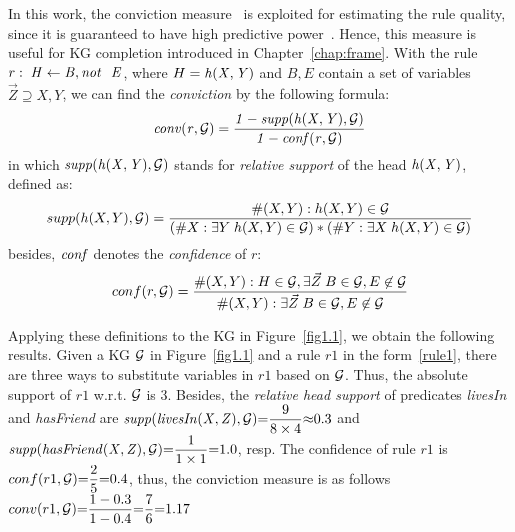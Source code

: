 In this work, the conviction measure~\cite{ref48} is exploited for estimating the rule quality, since it is guaranteed to have high predictive power~\cite{ref46}. Hence, this measure is useful for KG completion introduced in Chapter~\ref{chap:frame}. With the rule $r:\;\mi{H\leftarrow B, \naf\ E}$, where $H=\mathit{h(X,Y)}$ and $B,E$ contain a set of variables $\vec{Z}\supseteq X,Y$, we can find the \emph{conviction} by the following formula:
\vspace{-.26cm}
\begin{equation}
\mathit{conv(r, \mathcal{G})= \dfrac{1 - supp(h(X,Y), \mathcal{G})}{1 - conf(r, \mathcal{G})}}
\end{equation}
in which $\mathit{supp(h(X,Y),\mathcal{G})}$ stands for \textit{relative support} of the head $\mathit{h(X,Y)}$, defined as:
\vspace{-.28cm}
\begin{equation}
supp(h(X,Y),\mathcal{G})=\dfrac{\#(X,Y):h(X,Y)\in \mathcal{G}}{(\#X:\exists Y\;h(X,Y)\in \mathcal{G})*(\#Y:\exists X\;h(X,Y)\in \mathcal{G})}
\end{equation}
besides, $\mathit{conf}$ denotes the \textit{confidence} of $r$:
\begin{equation}
conf(r,\mathcal{G})=\dfrac{\#(X,Y): H \in \mathcal{G}, \exists \vec{Z}\;B\in \mathcal{G},E \not \in \mathcal{G}}{\#(X,Y):\exists \vec{Z}\; B\in \mathcal{G}, E \not \in \mathcal{G}}
\end{equation}
\vspace{-.3cm}

\begin{example}
Applying these definitions to the KG in Figure~\ref{fig1.1}, we obtain the following results. Given a KG $\mathcal{G}$ in Figure~\ref{fig1.1} and a rule $r1$ in the form~\ref{rule1}, there are three ways to substitute variables in $r1$ based on $\mathcal{G}$. Thus, the absolute support of $r1$ w.r.t. $\mathcal{G}$ is $3$. Besides, the \textit{relative head support} of predicates \textit{livesIn} and \textit{hasFriend} are $\mathit{supp(livesIn(X,Z), \mathcal{G})}{=}\dfrac{9}{8 \times 4}{\approx} 0.3$ and  $\mathit{supp(hasFriend(X,Z), \mathcal{G})}{=}\dfrac{1}{1 \times 1}{=} 1.0$, resp. The confidence of rule $r1$ is $conf(r1, \mathcal{G}) {=} \dfrac{2}{5} {=} 0.4$, thus, the conviction measure is as follows $conv(r1, \mathcal{G}) {=} \dfrac{1-0.3}{1 - 0.4} {=} \dfrac{7}{6} {=} 1.17$
\end{example}